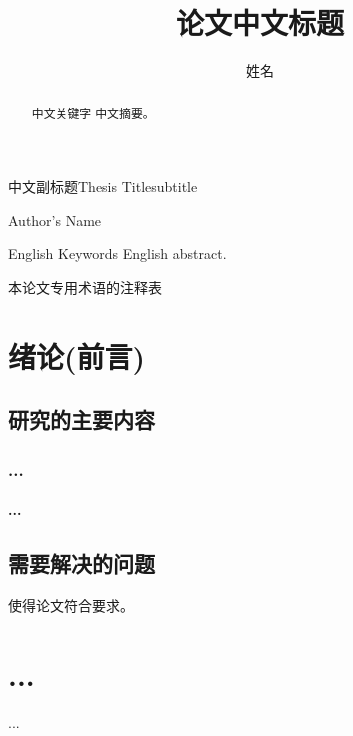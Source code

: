 \documentclass[bachelor]{seuthesis} %
\begin{document}
\title{论文中文标题}{中文副标题}{Thesis Title}{subtitle}
\author{姓\quad{}名}{Author's Name}
\address{河海院2楼}
\maketitle

\begin{abstract}{中文关键字}
  中文摘要。
\end{abstract}

\begin{englishabstract}{English Keywords}
  English abstract.
\end{englishabstract}

\tableofcontents

\begin{terminology}
  本论文专用术语的注释表
\end{terminology}

\begin{Main} %

\chapter{绪论(前言)}
\section{研究的主要内容}
\subsection{...}
\subsubsection{...}
\section{需要解决的问题}
使得论文符合要求\cite{seugs:standard}。

\chapter{...}
...

\end{Main} %
\end{document}
